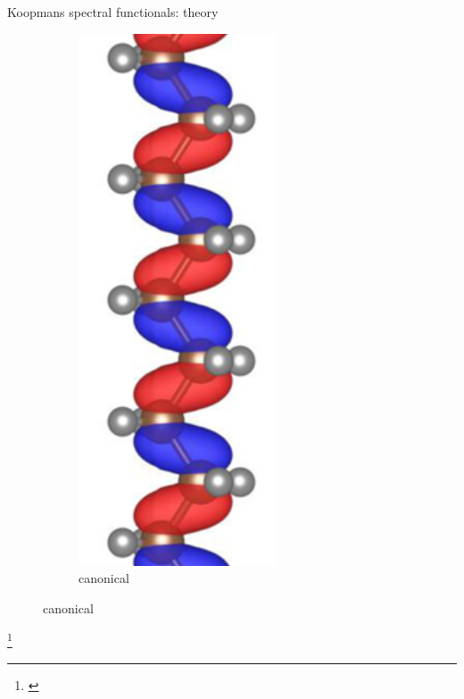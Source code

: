 \documentclass[xcolor=table,aspectratio=169]{beamer}
\newcommand\blfootcite[1]{%
  \begingroup
  \renewcommand\thefootnote{}\footnote{\hspace{-4ex}\cite{#1}}%
  \addtocounter{footnote}{-1}%
  \endgroup
}
\numberwithin{equation}{section}
\begin{document}
\begin{frame}{Koopmans spectral functionals: theory}
\begin{overlayarea}{\textwidth}{0.4\textheight}
{\begin{figure}[t]
\begin{subfigure}{0.3\textwidth}
               \includegraphics[height=\columnwidth,angle=90]{figures/fig_nguyen_canonical_orbital.png}
               \caption{canonical}
            \end{subfigure}
         \end{figure}
      }
   \end{overlayarea}
   \blfootcite{Nguyen2018}
\end{frame}
\end{document}
